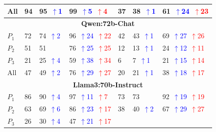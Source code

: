 \begin{table}
\begin{tabularx}{\textwidth}{l X X X X X X}
All 
& 94 
& 95~\textcolor{blue}{\scriptsize$\uparrow$1}   
& 99~\textcolor{blue}{\scriptsize$\uparrow$5}~\textcolor{red}{\scriptsize$\uparrow$4}
& 37 
& 38~\textcolor{blue}{\scriptsize$\uparrow$1}   
& 61~\textcolor{blue}{\scriptsize$\uparrow$24}~\textcolor{red}{\scriptsize$\uparrow$23} \\
\midrule
\multicolumn{7}{c}{\small\textbf{Qwen:72b-Chat}} \\
\midrule
$P_1$ 
& 72 
& 74~\textcolor{blue}{\scriptsize$\uparrow$2}   
& 96~\textcolor{blue}{\scriptsize$\uparrow$24}~\textcolor{red}{\scriptsize$\uparrow$22}
& 42 
& 43~\textcolor{blue}{\scriptsize$\uparrow$1}   
& 69~\textcolor{blue}{\scriptsize$\uparrow$27}~\textcolor{red}{\scriptsize$\uparrow$26} \\
$P_2$ 
& 51 
& 51
& 76~\textcolor{blue}{\scriptsize$\uparrow$25}~\textcolor{red}{\scriptsize$\uparrow$25}
& 12 
& 13~\textcolor{blue}{\scriptsize$\uparrow$1}   
& 24~\textcolor{blue}{\scriptsize$\uparrow$12}~\textcolor{red}{\scriptsize$\uparrow$11} \\
$P_3$ 
& 21 
& 25~\textcolor{blue}{\scriptsize$\uparrow$4}   
& 59~\textcolor{blue}{\scriptsize$\uparrow$38}~\textcolor{red}{\scriptsize$\uparrow$34}
& 6 
& 7~\textcolor{blue}{\scriptsize$\uparrow$1}   
& 21~\textcolor{blue}{\scriptsize$\uparrow$15}~\textcolor{red}{\scriptsize$\uparrow$14} \\
All 
& 47 
& 49~\textcolor{blue}{\scriptsize$\uparrow$2}   
& 76~\textcolor{blue}{\scriptsize$\uparrow$29}~\textcolor{red}{\scriptsize$\uparrow$27}
& 20 
& 21~\textcolor{blue}{\scriptsize$\uparrow$1}   
& 38~\textcolor{blue}{\scriptsize$\uparrow$18}~\textcolor{red}{\scriptsize$\uparrow$17} \\
\midrule
\multicolumn{7}{c}{\small\textbf{Llama3:70b-Instruct}} \\
\midrule
$P_1$ 
& 86 
& 90~\textcolor{blue}{\scriptsize$\uparrow$4}   
& 97~\textcolor{blue}{\scriptsize$\uparrow$11}~\textcolor{red}{\scriptsize$\uparrow$7}
& 73 
& 73
& 92~\textcolor{blue}{\scriptsize$\uparrow$19}~\textcolor{red}{\scriptsize$\uparrow$19} \\
$P_2$ 
& 63
& 69~\textcolor{blue}{\scriptsize$\uparrow$6}   
& 86~\textcolor{blue}{\scriptsize$\uparrow$23}~\textcolor{red}{\scriptsize$\uparrow$17}
& 38 
& 40~\textcolor{blue}{\scriptsize$\uparrow$2}   
& 67~\textcolor{blue}{\scriptsize$\uparrow$29}~\textcolor{red}{\scriptsize$\uparrow$27} \\
$P_3$ 
& 26 
& 30~\textcolor{blue}{\scriptsize$\uparrow$4}   
& 47~\textcolor{blue}{\scriptsize$\uparrow$21}~\textcolor{red}{\scriptsize$\uparrow$17}

\end{tabularx}
\end{table}
